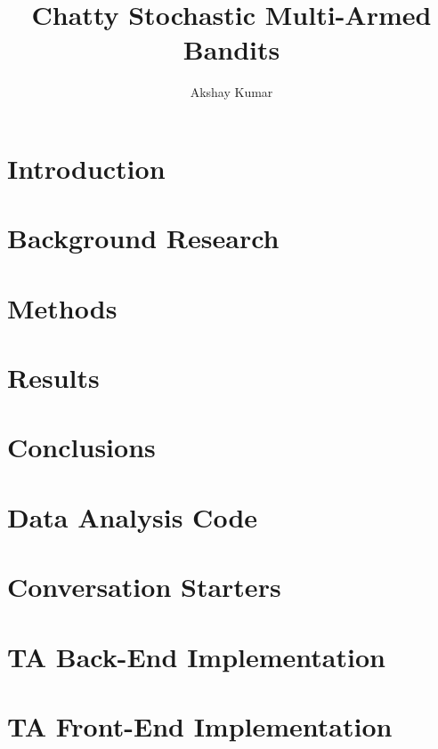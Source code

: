 \documentclass[10pt,lot,lof]{puthesis_undergraduate}
\title{Chatty Stochastic Multi-Armed Bandits}
\author{Akshay Kumar}
\let\savedbegincmd\begincmd
\let\begincmd\relax
\begin{document}
\savedbegincmd

\chapter{Introduction}
\label{ch:Introduction} 


\chapter{Background Research}
\label{ch:LiteratureReview}


\chapter{Methods}
\label{ch:Methods}


\chapter{Results}
\label{ch:DataAnalysis}


\chapter{Conclusions}
\label{ch:Conclusion}


\appendix
\chapter{Data Analysis Code}
\label{app:DataAnalysisCode}


\chapter{Conversation Starters}
\label{app:ConversationStarters}


\chapter{TA Back-End Implementation}
\label{app:TABackendImplementation}


\chapter{TA Front-End Implementation}
\label{app:TAFrontendImplementation}




\end{document}
